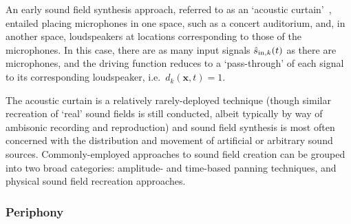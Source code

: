 
An early sound field synthesis approach, referred to as an `acoustic
curtain'~\citep{ziemer_wave_2020}, entailed placing microphones in one space,
such as a concert auditorium, and, in another space, loudspeakers at locations
corresponding to those of the microphones.
In this case, there are as many input signals $\hat{s}_{\text{in},k}(t)$ as there are
microphones, and the driving function reduces to a `pass-through' of each
signal to its corresponding loudspeaker, i.e.\
$d_k(\mathbf{x}, t) = 1$.

The acoustic curtain is a relatively rarely-deployed technique (though similar
recreation of `real' sound fields is still conducted, albeit typically by way
of ambisonic recording and reproduction) and sound field synthesis is most
often concerned with the distribution and movement of artificial or arbitrary
sound sources.
Commonly-employed approaches to sound field creation can be grouped into two
broad categories: amplitude- and time-based panning techniques, and physical
sound field recreation approaches.

\subsubsection{Periphony}\label{subsubsec:periphony}

